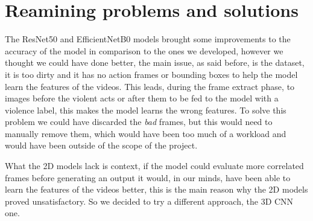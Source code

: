\section{Reamining problems and solutions} 
The ResNet50 and EfficientNetB0 models brought some improvements to the accuracy of the model in comparison to the ones we developed, however we thought we could have done better, the main issue, as said before, is the dataset, it is too dirty and it has no action frames or bounding boxes to help the model learn the features of the videos. This leads, during the frame extract phase, to images before the violent acts or after them to be fed to the model with a violence label, this makes the model learns the wrong features. To solve this problem we could have discarded the \textit{bad} frames, but this would need to manually remove them, which would have been too much of a workload and would have been outside of the scope of the project.

    What the 2D models lack is context, if the model could evaluate more correlated frames before generating an output it would, in our minds, have been able to learn the features of the videos better, this is the main reason why the 2D models proved unsatisfactory. So we decided to try a different approach, the 3D CNN one.
